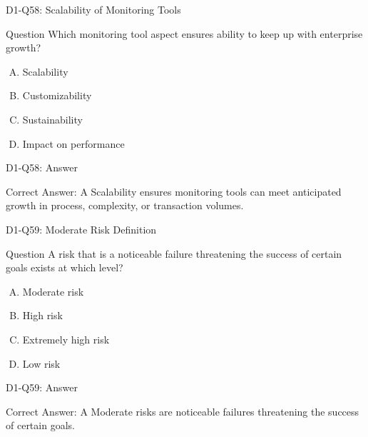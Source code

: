 \documentclass{beamer}
\begin{document}
	\begin{frame}{D1-Q58: Scalability of Monitoring Tools}
		\begin{block}{Question}
			Which monitoring tool aspect ensures ability to keep up with enterprise growth?
		\end{block}
		\begin{enumerate}[(A)]
			\item Scalability
			\item Customizability
			\item Sustainability
			\item Impact on performance
		\end{enumerate}
	\end{frame}
	\begin{frame}{D1-Q58: Answer}
		\begin{block}{Correct Answer: A}
			Scalability ensures monitoring tools can meet anticipated growth in process, complexity, or transaction volumes.
		\end{block}
	\end{frame}
	
	\begin{frame}{D1-Q59: Moderate Risk Definition}
		\begin{block}{Question}
			A risk that is a noticeable failure threatening the success of certain goals exists at which level?
		\end{block}
		\begin{enumerate}[(A)]
			\item Moderate risk
			\item High risk
			\item Extremely high risk
			\item Low risk
		\end{enumerate}
	\end{frame}
	\begin{frame}{D1-Q59: Answer}
		\begin{block}{Correct Answer: A}
			Moderate risks are noticeable failures threatening the success of certain goals.
		\end{block}
	\end{frame}
	
\end{document}
